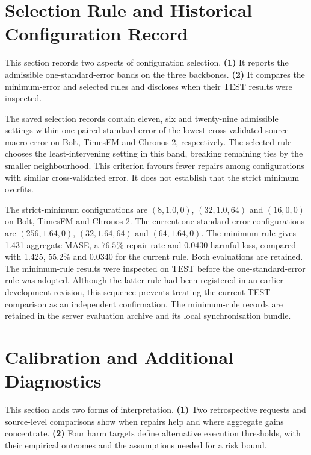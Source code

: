 \documentclass{article}
\begin{document}
\section{Selection Rule and Historical Configuration Record}
\label{app:selection-rule}

This section records two aspects of configuration selection. \textbf{(1)} It reports the admissible one-standard-error bands on the three backbones. \textbf{(2)} It compares the minimum-error and selected rules and discloses when their TEST results were inspected.

The saved selection records contain eleven, six and twenty-nine admissible settings within
one paired standard error of the lowest cross-validated source-macro error on Bolt, TimesFM
and Chronos-2, respectively. The selected rule chooses the least-intervening setting in this
band, breaking remaining ties by the smaller neighbourhood. This criterion favours fewer
repairs among configurations with similar cross-validated error. It does not establish that
the strict minimum overfits.

The strict-minimum configurations are $(8,1.0,0)$, $(32,1.0,64)$ and $(16,0,0)$ on Bolt,
TimesFM and Chronos-2. The current one-standard-error configurations are $(256,1.64,0)$,
$(32,1.64,64)$ and $(64,1.64,0)$. The minimum rule gives 1.431 aggregate MASE, a $76.5\%$
repair rate and 0.0430 harmful loss, compared with 1.425, $55.2\%$ and 0.0340 for the
current rule. Both evaluations are retained. The minimum-rule results were inspected on
TEST before the one-standard-error rule was adopted. Although the latter rule had been
registered in an earlier development revision, this sequence prevents treating the current
TEST comparison as an independent confirmation. The minimum-rule records are retained in
the server evaluation archive and its local synchronisation bundle.

\section{Calibration and Additional Diagnostics}
\label{app:layout-details}
This section adds two forms of interpretation. \textbf{(1)} Two retrospective requests and source-level comparisons show when repairs help and where aggregate gains concentrate. \textbf{(2)} Four harm targets define alternative execution thresholds, with their empirical outcomes and the assumptions needed for a risk bound.
\end{document}
